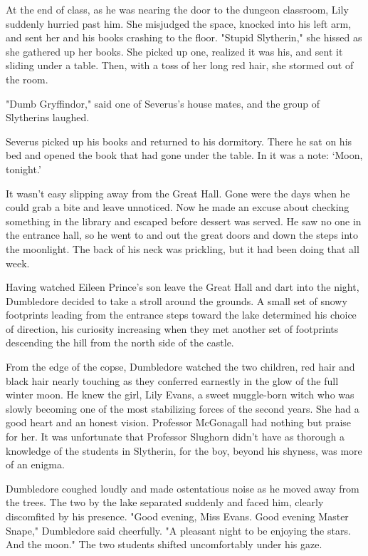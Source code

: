 \documentclass[a4paper,11pt]{article}
\begin{document}
At the end of class, as he was nearing the door to the dungeon classroom, Lily suddenly hurried past him. She misjudged the space, knocked into his left arm, and sent her and his books crashing to the floor. "Stupid Slytherin," she hissed as she gathered up her books. She picked up one, realized it was his, and sent it sliding under a table. Then, with a toss of her long red hair, she stormed out of the room.

"Dumb Gryffindor," said one of Severus's house mates, and the group of Slytherins laughed.

Severus picked up his books and returned to his dormitory. There he sat on his bed and opened the book that had gone under the table. In it was a note: `Moon, tonight.'

It wasn't easy slipping away from the Great Hall. Gone were the days when he could grab a bite and leave unnoticed. Now he made an excuse about checking something in the library and escaped before dessert was served. He saw no one in the entrance hall, so he went to and out the great doors and down the steps into the moonlight. The back of his neck was prickling, but it had been doing that all week.

Having watched Eileen Prince's son leave the Great Hall and dart into the night, Dumbledore decided to take a stroll around the grounds. A small set of snowy footprints leading from the entrance steps toward the lake determined his choice of direction, his curiosity increasing when they met another set of footprints descending the hill from the north side of the castle.

From the edge of the copse, Dumbledore watched the two children, red hair and black hair nearly touching as they conferred earnestly in the glow of the full winter moon. He knew the girl, Lily Evans, a sweet muggle-born witch who was slowly becoming one of the most stabilizing forces of the second years. She had a good heart and an honest vision. Professor McGonagall had nothing but praise for her. It was unfortunate that Professor Slughorn didn't have as thorough a knowledge of the students in Slytherin, for the boy, beyond his shyness, was more of an enigma.

Dumbledore coughed loudly and made ostentatious noise as he moved away from the trees. The two by the lake separated suddenly and faced him, clearly discomfited by his presence. "Good evening, Miss Evans. Good evening Master Snape," Dumbledore said cheerfully. "A pleasant night to be enjoying the stars. And the moon." The two students shifted uncomfortably under his gaze.
\end{document}
